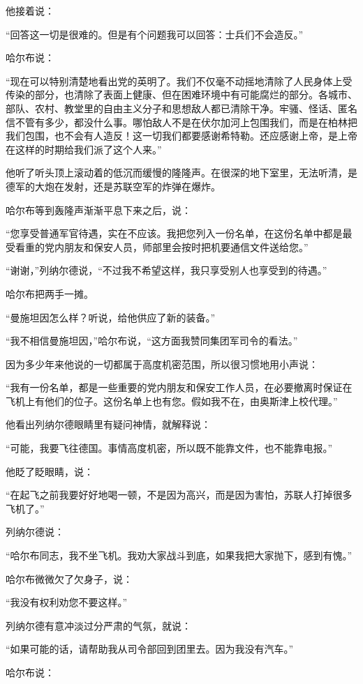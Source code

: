 他接着说：

“回答这一切是很难的。但是有个问题我可以回答：士兵们不会造反。”

哈尔布说：

“现在可以特别清楚地看出党的英明了。我们不仅毫不动摇地清除了人民身体上受传染的部分，也清除了表面上健康、但在困难环境中有可能腐烂的部分。各城市、部队、农村、教堂里的自由主义分子和思想敌人都已清除干净。牢骚、怪话、匿名信不管有多少，都没什么事。哪怕敌人不是在伏尔加河上包围我们，而是在柏林把我们包围，也不会有人造反！这一切我们都要感谢希特勒。还应感谢上帝，是上帝在这样的时期给我们派了这个人来。”

他听了听头顶上滚动着的低沉而缓慢的隆隆声。在很深的地下室里，无法听清，是德军的大炮在发射，还是苏联空军的炸弹在爆炸。

哈尔布等到轰隆声渐渐平息下来之后，说：

“您享受普通军官待遇，实在不应该。我把您列入一份名单，在这份名单中都是最受看重的党内朋友和保安人员，师部里会按时把机要通信文件送给您。”

“谢谢，”列纳尔德说，“不过我不希望这样，我只享受别人也享受到的待遇。”

哈尔布把两手一摊。

“曼施坦因怎么样？听说，给他供应了新的装备。”

“我不相信曼施坦因，”哈尔布说，“这方面我赞同集团军司令的看法。”

因为多少年来他说的一切都属于高度机密范围，所以很习惯地用小声说：

“我有一份名单，都是一些重要的党内朋友和保安工作人员，在必要撤离时保证在飞机上有他们的位子。这份名单上也有您。假如我不在，由奥斯津上校代理。”

他看出列纳尔德眼睛里有疑问神情，就解释说：

“可能，我要飞往德国。事情高度机密，所以既不能靠文件，也不能靠电报。”

他眨了眨眼睛，说：

“在起飞之前我要好好地喝一顿，不是因为高兴，而是因为害怕，苏联人打掉很多飞机了。”

列纳尔德说：

“哈尔布同志，我不坐飞机。我劝大家战斗到底，如果我把大家抛下，感到有愧。”

哈尔布微微欠了欠身子，说：

“我没有权利劝您不要这样。”

列纳尔德有意冲淡过分严肃的气氛，就说：

“如果可能的话，请帮助我从司令部回到团里去。因为我没有汽车。”

哈尔布说：

